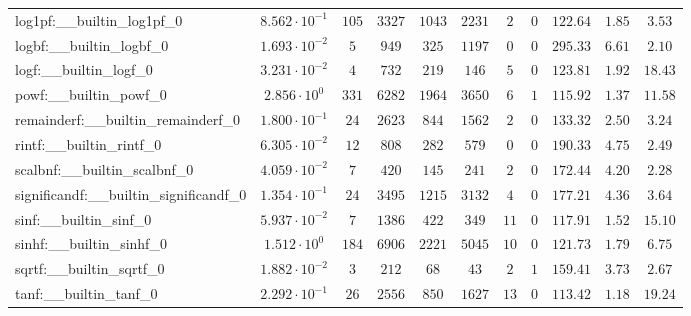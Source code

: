 \begin{tabular}{|l|c|c|c|c|c|c|c|c|c|c|}
log1pf:\_\_builtin\_log1pf\_0             & $ 8.562 \cdot 10^{-1} $ & $ 105    $ & $ 3327   $ & $ 1043  $ & $ 2231  $ & $ 2   $ & $ 0 $ & $ 122.64      $ & $ 1.85    $ & $ 3.53    $ \\
logbf:\_\_builtin\_logbf\_0               & $ 1.693 \cdot 10^{-2} $ & $ 5      $ & $ 949    $ & $ 325   $ & $ 1197  $ & $ 0   $ & $ 0 $ & $ 295.33      $ & $ 6.61    $ & $ 2.10    $ \\
logf:\_\_builtin\_logf\_0                 & $ 3.231 \cdot 10^{-2} $ & $ 4      $ & $ 732    $ & $ 219   $ & $ 146   $ & $ 5   $ & $ 0 $ & $ 123.81      $ & $ 1.92    $ & $ 18.43   $ \\
powf:\_\_builtin\_powf\_0                 & $ 2.856 \cdot 10^{0}  $ & $ 331    $ & $ 6282   $ & $ 1964  $ & $ 3650  $ & $ 6   $ & $ 1 $ & $ 115.92      $ & $ 1.37    $ & $ 11.58   $ \\
remainderf:\_\_builtin\_remainderf\_0     & $ 1.800 \cdot 10^{-1} $ & $ 24     $ & $ 2623   $ & $ 844   $ & $ 1562  $ & $ 2   $ & $ 0 $ & $ 133.32      $ & $ 2.50    $ & $ 3.24    $ \\
rintf:\_\_builtin\_rintf\_0               & $ 6.305 \cdot 10^{-2} $ & $ 12     $ & $ 808    $ & $ 282   $ & $ 579   $ & $ 0   $ & $ 0 $ & $ 190.33      $ & $ 4.75    $ & $ 2.49    $ \\
scalbnf:\_\_builtin\_scalbnf\_0           & $ 4.059 \cdot 10^{-2} $ & $ 7      $ & $ 420    $ & $ 145   $ & $ 241   $ & $ 2   $ & $ 0 $ & $ 172.44      $ & $ 4.20    $ & $ 2.28    $ \\
significandf:\_\_builtin\_significandf\_0 & $ 1.354 \cdot 10^{-1} $ & $ 24     $ & $ 3495   $ & $ 1215  $ & $ 3132  $ & $ 4   $ & $ 0 $ & $ 177.21      $ & $ 4.36    $ & $ 3.64    $ \\
sinf:\_\_builtin\_sinf\_0                 & $ 5.937 \cdot 10^{-2} $ & $ 7      $ & $ 1386   $ & $ 422   $ & $ 349   $ & $ 11  $ & $ 0 $ & $ 117.91      $ & $ 1.52    $ & $ 15.10   $ \\
sinhf:\_\_builtin\_sinhf\_0               & $ 1.512 \cdot 10^{0}  $ & $ 184    $ & $ 6906   $ & $ 2221  $ & $ 5045  $ & $ 10  $ & $ 0 $ & $ 121.73      $ & $ 1.79    $ & $ 6.75    $ \\
sqrtf:\_\_builtin\_sqrtf\_0               & $ 1.882 \cdot 10^{-2} $ & $ 3      $ & $ 212    $ & $ 68    $ & $ 43    $ & $ 2   $ & $ 1 $ & $ 159.41      $ & $ 3.73    $ & $ 2.67    $ \\
tanf:\_\_builtin\_tanf\_0                 & $ 2.292 \cdot 10^{-1} $ & $ 26     $ & $ 2556   $ & $ 850   $ & $ 1627  $ & $ 13  $ & $ 0 $ & $ 113.42      $ & $ 1.18    $ & $ 19.24   $ \\

\end{tabular}
